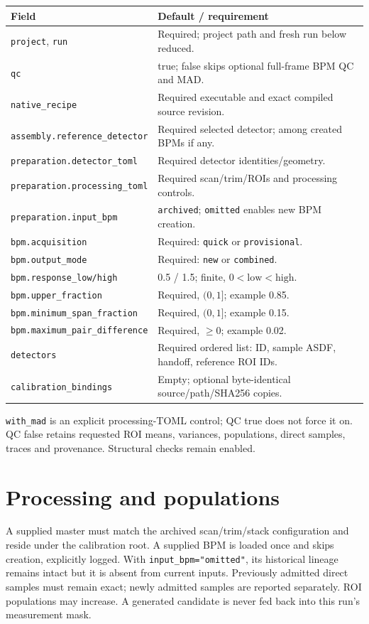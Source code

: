 \documentclass[10pt,a4paper]{article}
\begin{document}
\begin{tabular}{p{.39\linewidth}p{.54\linewidth}}
\textbf{Field} & \textbf{Default / requirement}\\\hline
\texttt{project}, \texttt{run} & Required; project path and fresh run below reduced.\\
\texttt{qc} & true; false skips optional full-frame BPM QC and MAD.\\
\texttt{native\_recipe} & Required executable and exact compiled source revision.\\
\texttt{assembly.reference\_detector} & Required selected detector; among created BPMs if any.\\
\texttt{preparation.detector\_toml} & Required detector identities/geometry.\\
\texttt{preparation.processing\_toml} & Required scan/trim/ROIs and processing controls.\\
\texttt{preparation.input\_bpm} & \texttt{archived}; \texttt{omitted} enables new BPM creation.\\
\texttt{bpm.acquisition} & Required: \texttt{quick} or \texttt{provisional}.\\
\texttt{bpm.output\_mode} & Required: \texttt{new} or \texttt{combined}.\\
\texttt{bpm.response\_low/high} & 0.5 / 1.5; finite, $0<\mathrm{low}<\mathrm{high}$.\\
\texttt{bpm.upper\_fraction} & Required, $(0,1]$; example 0.85.\\
\texttt{bpm.minimum\_span\_fraction} & Required, $(0,1]$; example 0.15.\\
\texttt{bpm.maximum\_pair\_difference} & Required, $\geq0$; example 0.02.\\
\texttt{detectors} & Required ordered list: ID, sample ASDF, handoff, reference ROI IDs.\\
\texttt{calibration\_bindings} & Empty; optional byte-identical source/path/SHA256 copies.\\
\end{tabular}

\texttt{with\_mad} is an explicit processing-TOML control; QC true does not
force it on. QC false retains requested ROI means, variances, populations,
direct samples, traces and provenance. Structural checks remain enabled.

\section*{Processing and populations}
A supplied master must match the archived scan/trim/stack configuration and
reside under the calibration root. A supplied BPM is loaded once and skips
creation, explicitly logged. With \texttt{input\_bpm="omitted"}, its historical
lineage remains intact but it is absent from current inputs. Previously admitted
direct samples must remain exact; newly admitted samples are reported separately.
ROI populations may increase. A generated candidate is never fed back into
this run's measurement mask.
\end{document}

